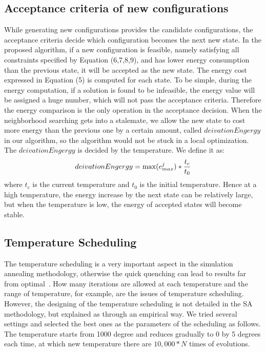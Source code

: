 \documentclass[10pt, conference, compsocconf]{IEEEtran}
\begin{document}
\subsection{ Acceptance criteria of new configurations}
While generating new configurations provides the candidate configurations, the
acceptance criteria decide which configuration becomes the next new state. In
the proposed algorithm, if a new configuration is feasible, namely satisfying all constraints
specified by Equation (6,7,8,9), and has lower energy consumption than the
previous state, it will be accepted as the new state.
The energy cost expressed in Equation (5) is computed for each state. To be
simple, during the energy computation, if a solution is found to be infeasible,
the energy value will be assigned a huge number, which will not pass the
acceptance criteria. Therefore the energy comparison is the only operation in
the acceptance decision. When the neighborhood searching gets into a stalemate, we
allow the new state to cost more energy than the previous one by a certain
amount, called $deivationEngergy$ in our algorithm, so the algorithm would not
be stuck in a local optimization.
The $deivationEngergy$ is decided by the temperature. We define it as:
\begin{equation}\label{11}
deivationEngergy=\max(e_{max}^j)*\frac{t_c}{t_0} \\
\end{equation}
where $t_c$ is the current temperature and $t_0$ is the initial temperature.
Hence at a high temperature, the energy increase by the next state can be
relatively large, but when the temperature is low, the energy of accepted states
will become stable.

\subsection{ Temperature Scheduling}
The temperature scheduling is a very important aspect in the simulation
annealing methodology, otherwise the quick quenching can lead to results far
from optimal~\cite{kirkpatrick83}. How many iterations are allowed at each
temperature and the range of temperature, for example, are the issues of
temperature scheduling.
However, the designing of the temperature scheduling is not detailed in the SA
methodology, but explained as through an empirical way. We tried several
settings and selected the best ones as the parameters of the scheduling as
follows.
The temperature starts from 1000 degree and reduces gradually to 0 by 5 degrees
each time, at which new temperature there are $10,000*N$ times of evolutions.
\end{document}
